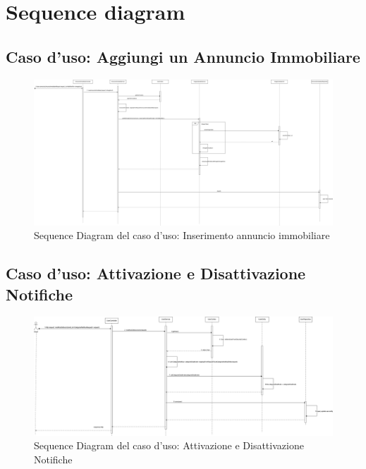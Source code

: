 \section{Sequence diagram}

\subsection{Caso d'uso: Aggiungi un Annuncio Immobiliare}

\begin{figure}[H]
	\centering
	\includegraphics[width=\textwidth,height=\textheight,keepaspectratio]{Immagini/Sequence diagram/SequenceDiagram inserimentoAnnuncio.png}
	\caption[Sequence diagram 1]{Sequence Diagram del caso d'uso: Inserimento annuncio immobiliare}
\end{figure}

\subsection{Caso d'uso: Attivazione e Disattivazione Notifiche}

\begin{figure}[H]
	\centering
	\includegraphics[width=\textwidth,height=\textheight,keepaspectratio]{Immagini/Sequence diagram/Sequence Diagram Gestione Notifiche.png}
	\caption[Sequence diagram 2]{Sequence Diagram del caso d'uso: Attivazione e Disattivazione Notifiche}
\end{figure}

